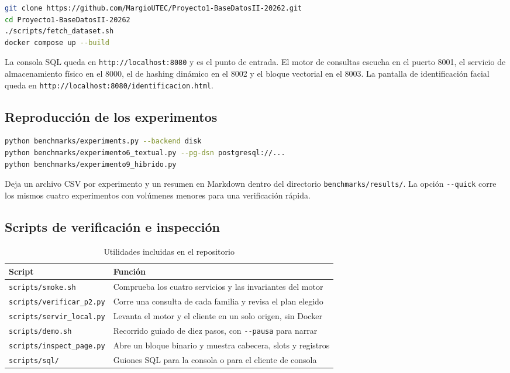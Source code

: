 \documentclass[a4paper,12pt]{article}
\begin{document}
\begin{lstlisting}[language=bash, caption={Ejecución del sistema}]
git clone https://github.com/MargioUTEC/Proyecto1-BaseDatosII-20262.git
cd Proyecto1-BaseDatosII-20262
./scripts/fetch_dataset.sh
docker compose up --build
\end{lstlisting}

La consola SQL queda en \texttt{http://localhost:8080} y es el punto de entrada.
El motor de consultas escucha en el puerto 8001, el servicio de almacenamiento
físico en el 8000, el de hashing dinámico en el 8002 y el bloque vectorial en el
8003. La pantalla de identificación facial queda en
\texttt{http://localhost:8080/identificacion.html}.

\subsection{Reproducción de los experimentos}

\begin{lstlisting}[language=bash, caption={Arnés de experimentación}]
python benchmarks/experiments.py --backend disk
python benchmarks/experimento6_textual.py --pg-dsn postgresql://...
python benchmarks/experimento9_hibrido.py
\end{lstlisting}

Deja un archivo CSV por experimento y un resumen en Markdown dentro del
directorio \texttt{benchmarks/\allowbreak results/}. La opción
\texttt{-{}-quick} corre los mismos
cuatro experimentos con volúmenes menores para una verificación rápida.

\subsection{Scripts de verificación e inspección}

\begin{table}[H]
\centering
\caption{Utilidades incluidas en el repositorio}
\begin{tabularx}{\textwidth}{@{}lX@{}}
\toprule
\textbf{Script} & \textbf{Función} \\
\midrule
\texttt{scripts/smoke.sh} & Comprueba los cuatro servicios y las invariantes del motor \\
\texttt{scripts/verificar\_p2.py} & Corre una consulta de cada familia y revisa el plan elegido \\
\texttt{scripts/servir\_local.py} & Levanta el motor y el cliente en un solo origen, sin Docker \\
\texttt{scripts/demo.sh} & Recorrido guiado de diez pasos, con \texttt{-{}-pausa} para narrar \\
\texttt{scripts/inspect\_page.py} & Abre un bloque binario y muestra cabecera, slots y registros \\
\texttt{scripts/sql/} & Guiones SQL para la consola o para el cliente de consola \\
\bottomrule
\end{tabularx}
\end{table}
\end{document}
